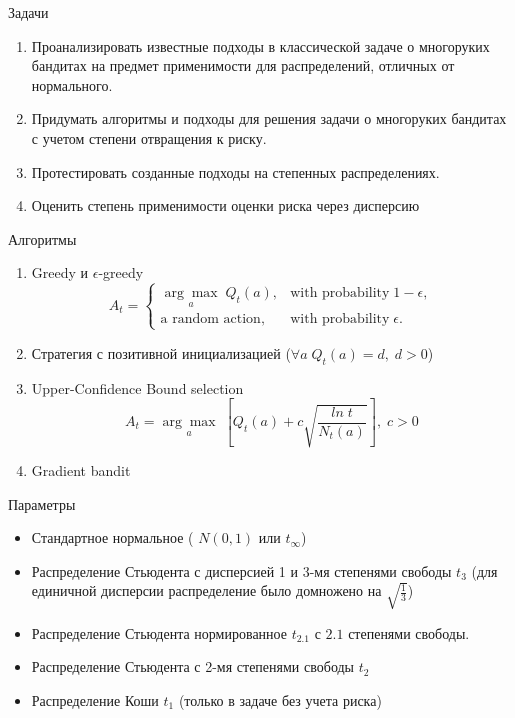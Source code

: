 \documentclass[10pt]{beamer} %
\begin{document}
\begin{frame}{Задачи}
    \begin{enumerate}
        \item<1-> Проанализировать известные подходы в классической задаче о многоруких бандитах на предмет применимости для распределений, отличных от нормального.
        \item<2-> Придумать алгоритмы и подходы для решения задачи о многоруких бандитах с учетом степени отвращения к риску.
        \item<3-> Протестировать созданные подходы на степенных распределениях.
        \item<4-> Оценить степень применимости оценки риска через дисперсию
    \end{enumerate}
\end{frame}

\begin{frame}{Алгоритмы}
    \begin{enumerate}
        \item<1-> Greedy и $\epsilon$-greedy
            $$A_t = \begin{cases}
        \underset{a}{\arg \max} \; Q_t(a), & \text{with probability} \; 1 - \epsilon, \\
        \text{a random action}, & \text{with probability} \; \epsilon.
        \end{cases}$$ 
        \item<2-> Стратегия с позитивной инициализацией ($\forall a \; Q_t(a) = d, \; d > 0$)
        \item<3-> Upper-Confidence Bound selection $$A_t = \underset{a}{\arg \max} \; \left[ Q_t(a) + c \sqrt{\frac{ln \; t}{N_t(a)}} \right], \; c > 0$$
        \item<4-> Gradient bandit
    \end{enumerate}
\end{frame}

\begin{frame}{Параметры}
    \begin{itemize}
        \item Стандартное нормальное ( $N (0,1)$ или $t_{\infty}$)
        \item Распределение Стьюдента с дисперсией 1 и 3-мя степенями свободы $t_3$ (для единичной дисперсии распределение было домножено на $\sqrt{\frac{1}{3}}$)
        \item Распределение Стьюдента нормированное $t_{2.1}$ с $2.1$ степенями свободы.
        \item Распределение Стьюдента с 2-мя степенями свободы $t_2$
        \item Распределение Коши $t_1$ (только в задаче без учета риска)
    \end{itemize}
\end{frame}
\end{document}
